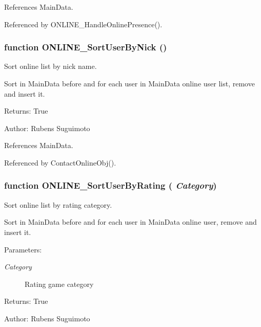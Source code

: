 References MainData.

Referenced by ONLINE\_\-HandleOnlinePresence().
\subsubsection[ONLINE\_\-SortUserByNick]{\setlength{\rightskip}{0pt plus 5cm}function ONLINE\_\-SortUserByNick ()}\label{online_8js_2df808934cda763a42e9307f04061157}


Sort online list by nick name. 

Sort in MainData before and for each user in MainData online user list, remove and insert it.

\begin{Desc}
\item[Returns:]True \end{Desc}
\begin{Desc}
\item[Author:]Rubens Suguimoto \end{Desc}


References MainData.

Referenced by ContactOnlineObj().
\subsubsection[ONLINE\_\-SortUserByRating]{\setlength{\rightskip}{0pt plus 5cm}function ONLINE\_\-SortUserByRating ( {\em Category})}\label{online_8js_f283780da225ffcac6f80ae1427ac1a0}


Sort online list by rating category. 

Sort in MainData before and for each user in MainData online user, remove and insert it.

\begin{Desc}
\item[Parameters:]
\begin{description}
\item[{\em Category}]Rating game category \end{description}
\end{Desc}
\begin{Desc}
\item[Returns:]True \end{Desc}
\begin{Desc}
\item[Author:]Rubens Suguimoto \end{Desc}



